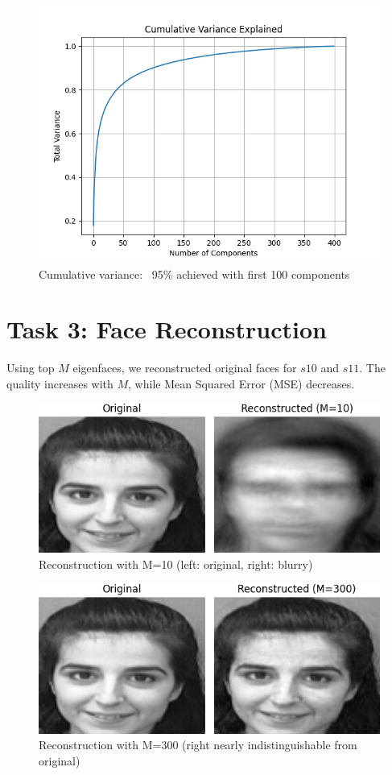 \documentclass[conference]{IEEEtran}
\begin{document}
\begin{figure}[htbp]
\centering
\includegraphics[width=\linewidth]{cumulative_variance.png}
\caption{Cumulative variance: ~95\% achieved with first 100 components}
\end{figure}

\section{Task 3: Face Reconstruction}
Using top \(M\) eigenfaces, we reconstructed original faces for \(s10\) and \(s11\). The quality increases with \(M\), while Mean Squared Error (MSE) decreases.

\begin{figure}[htbp]
\centering
\includegraphics[width=0.9\linewidth]{reconstructed/comparison_10_M10.png}
\caption{Reconstruction with M=10 (left: original, right: blurry)}
\end{figure}

\begin{figure}[htbp]
\centering
\includegraphics[width=0.9\linewidth]{reconstructed/comparison_10_M300.png}
\caption{Reconstruction with M=300 (right nearly indistinguishable from original)}
\end{figure}
\end{document}
